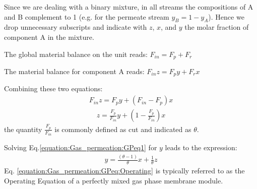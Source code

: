 \documentclass[letterpaper,10pt,english]{jupyterBook}
\begin{document}
\sphinxAtStartPar
Since we are dealing with a binary mixture, in all streams the compositions of A and B complement to 1 (e.g. for the permeate stream \(y_B=1-y_A\)). Hence we drop unnecessary subscripts and indicate with \(z\), \(x\), and \(y\) the molar fraction of component A in the mixture.

\sphinxAtStartPar
The global material balance on the unit reads: \(F_{in}=F_p+F_r\)

\sphinxAtStartPar
The material balance for component A reads: \(F_{in}z=F_py+F_rx\)

\sphinxAtStartPar
Combining these two equations:
\begin{equation*}
\begin{split}
F_{in}z=F_py+(F_{in}-F_p)x
\end{split}
\end{equation*}\begin{equation}\label{equation:Gas_permeation:GPeq1}
\begin{split}
z=\frac{F_p}{F_{in}}y+(1-\frac{F_p}{F_{in}})x
\end{split}
\end{equation}
\sphinxAtStartPar
the quantity \(\frac{F_p}{F_{in}}\) is commonly defined as cut and indicated as \(\theta\).

\sphinxAtStartPar
Solving Eq.\eqref{equation:Gas_permeation:GPeq1} for \(y\) leads to the expression:
\begin{equation}\label{equation:Gas_permeation:GPeq:Operating}
\begin{split}
y=\frac{\left(\theta-1\right)}{\theta}x+\frac{1}{\theta}z
\end{split}
\end{equation}
\sphinxAtStartPar
Eq. \eqref{equation:Gas_permeation:GPeq:Operating} is typically referred to as the Operating Equation of a perfectly mixed gas phase membrane module.
\end{document}
